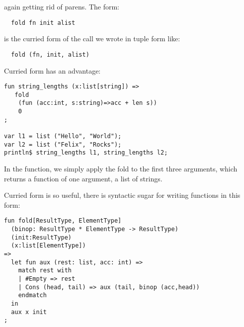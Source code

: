 \documentclass[oneside]{book}
\begin{document}
again getting rid of parens. The form:

\begin{verbatim}
  fold fn init alist
\end{verbatim}

is the curried form of the call we wrote in tuple form like:

\begin{verbatim}
  fold (fn, init, alist)
\end{verbatim}

Curried form has an advantage:

\begin{verbatim}
fun string_lengths (x:list[string]) =>
   fold 
    (fun (acc:int, s:string)=>acc + len s))
    0
;

var l1 = list ("Hello", "World");
var l2 = list ("Felix", "Rocks");
println$ string_lengths l1, string_lengths l2;
\end{verbatim}

In the function, we simply apply the fold to the
first three arguments, which returns a function 
of one argument, a list of strings.

Curried form is so useful, there is syntactic sugar
for writing functions in this form:

\begin{verbatim}
fun fold[ResultType, ElementType] 
  (binop: ResultType * ElementType -> ResultType)
  (init:ResultType)
  (x:list[ElementType])
=>
  let fun aux (rest: list, acc: int) =>
    match rest with
    | #Empty => rest
    | Cons (head, tail) => aux (tail, binop (acc,head))
    endmatch
  in 
  aux x init
;
\end{verbatim}
\end{document}
